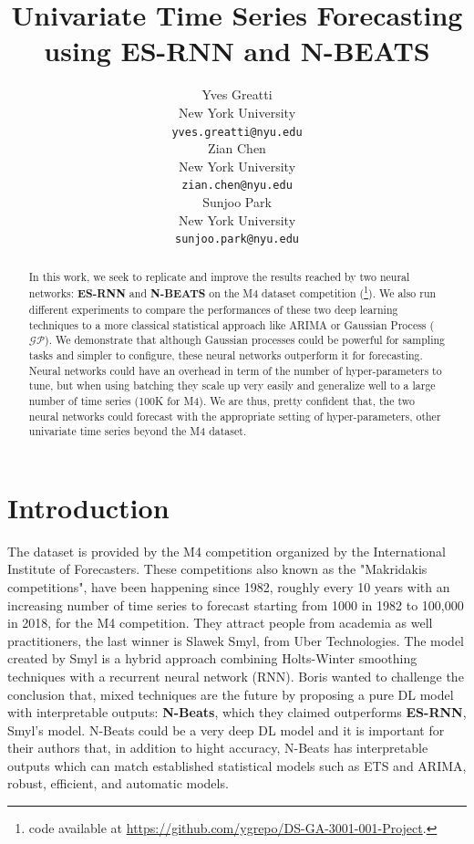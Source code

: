 \documentclass{article}
\title{Univariate Time Series Forecasting using ES-RNN and N-BEATS}
\author{%
  Yves Greatti \\
  New York University\\
  \texttt{yves.greatti@nyu.edu} \\
   \And
    Zian Chen \\
    New York University\\
    \texttt{zian.chen@nyu.edu} \\
    \And 
   Sunjoo Park\\
    New York University\\
    \texttt{sunjoo.park@nyu.edu}
}
\begin{document}
\maketitle

\begin{abstract}
  In this work, we seek to replicate and improve the results reached by two neural networks: \textbf{ES-RNN}  \cite{DBLP:journals/corr/abs-1907-03329} and \textbf{N-BEATS} \cite{DBLP:journals/corr/abs-1905-10437} 
  on the M4 dataset competition (\footnote{code available at \url{https://github.com/ygrepo/DS-GA-3001-001-Project}.}).
  We also run different experiments to compare the performances of these two deep learning techniques to a more classical statistical approach like ARIMA or Gaussian Process ($\mathcal{GP}$).
  We demonstrate that although Gaussian processes could be powerful for sampling tasks and simpler to configure, these neural networks outperform it for forecasting. 
  Neural networks could have an overhead in term of the number of hyper-parameters to tune, but when using batching they scale up very easily and generalize well to a large number of time series (100K for M4). 
  We are thus, pretty confident that, the two neural networks could forecast with the appropriate setting of hyper-parameters, other univariate time series beyond the M4 dataset.  
  
 \end{abstract}

\section{Introduction}
\label{Introduction}

The dataset is provided by the M4 competition organized by the International Institute of Forecasters. 
These competitions also known as the "Makridakis competitions", have been happening since 1982, roughly every 10 years with an increasing number of time series to forecast
starting from 1000 in 1982  to 100,000 in 2018, for the M4 competition. They attract people from academia as well practitioners, the last winner is Slawek Smyl, from Uber Technologies. 
The model created by Smyl is a hybrid approach combining Holts-Winter smoothing
techniques with a recurrent neural network (RNN). Boris 
\citet{DBLP:journals/corr/abs-1905-10437} wanted to challenge the conclusion that, mixed techniques are the future by proposing a pure DL model with interpretable outputs: \textbf{N-Beats}, 
which they claimed outperforms \textbf{ES-RNN}, Smyl's model. 
N-Beats could be a very deep DL model and it is important for their authors that, in addition to hight accuracy, 
N-Beats has interpretable outputs which can match established statistical models such as ETS and ARIMA, robust, efficient, and automatic models. 
\end{document}
